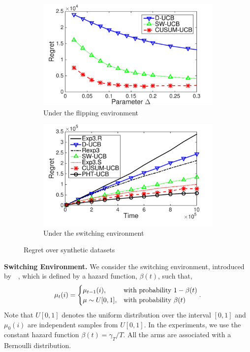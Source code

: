 \documentclass[letterpaper]{article}
\begin{document}
\begin{figure}[t]
\centering
\begin{subfigure}[b]{0.45\textwidth}
    \includegraphics[width=\textwidth]{delta}
     \caption{
 Under the flipping environment}\label{subfig:flip}
\end{subfigure}
\begin{subfigure}[b]{0.45\textwidth}
    \includegraphics[width=\textwidth]{SWEN_all_NIPS}
     \caption{
Under the switching environment}\label{subfig:switch}
\end{subfigure}
\caption{Regret over synthetic datasets}
\label{fig:synthetic}
\end{figure}


{\bf Switching Environment.}
We consider the switching environment, introduced by~\citeauthor{mellor2013thompson}~, which is defined by a hazard function, $\beta(t)$, such that,
\begin{eqnarray}\label{eqn:switch}
\mu_t(i)=
\begin{cases}
\mu_{t-1}(i), &\text{with probability } 1-\beta(t)\cr
\mu\sim U[0,1], &\text{with probability } \beta(t)
\end{cases}.
\end{eqnarray}
Note that $U[0,1]$ denotes the uniform distribution over the interval $[0,1]$ and $\mu_0(i)$ are independent samples from $U[0,1]$. In the experiments, we use the constant hazard function $\beta(t)=\gamma_T/T$. All the arms are associated with a Bernoulli distribution.
\end{document}

